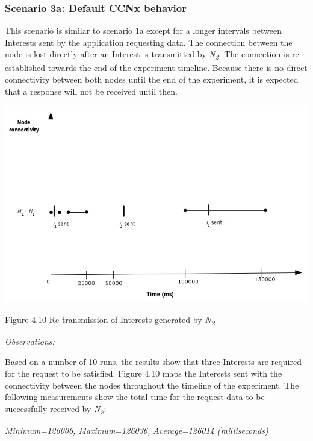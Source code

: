\documentclass[a4paper,12pt]{report}      %
\begin{document}
\subsubsection{Scenario 3a: Default CCNx behavior}

This scenario is similar to scenario 1a except for a longer intervals between Interests sent by the application requesting data. The connection between the node is lost directly after an Interest is transmitted by \emph{N\textsubscript{2}}. The connection is re-established towards the end of the experiment timeline. Because there is no direct connectivity between both nodes until the end of the experiment, it is expected that a response will not be received until then. 

\noindent\includegraphics[scale=0.55]{exp3a_timediag.jpg}\newline
\begin{center}Figure 4.10 Re-transmission of Interests generated by \emph{N\textsubscript{2}}\end{center} 

\vspace*{1\baselineskip}\noindent\emph{Observations:}

Based on a number of 10 runs, the results show that three Interests are required for the request to be
satisfied. Figure 4.10 maps the Interests sent with the connectivity between the nodes throughout the timeline of the experiment. 
The following measurements show the total time for the request data to be successfully received by \emph{N\textsubscript{2}}:

\begin{center}\textsl{Minimum=126006, Maximum=126036, Average=126014 (milliseconds)}\end{center}
\end{document}
